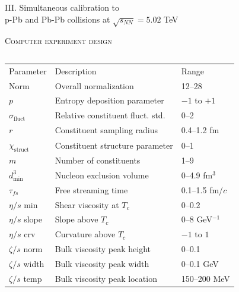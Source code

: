 \documentclass[aspectratio=169]{beamer}
\newcommand{\sqrts}{\sqrt{s_{NN}}}
\newcommand{\sigmaf}{\sigma_\text{fluct}}
\newcommand{\X}{\chi_\text{struct}}
\newcommand{\dmin}{d_\text{min}^3}
\newcommand{\paddedhline}{\noalign{\smallskip}\hline\noalign{\smallskip}}
\begin{document}
\begin{frame}
  \begin{center}
    \Large III. Simultaneous calibration to\\
    p-Pb and Pb-Pb collisions at $\sqrts=5.02$ TeV
  \end{center}
\end{frame}

\begin{frame}[t]{\scshape Computer experiment design}
  \bigskip
  \begin{columns}[T]
    \begin{column}{.6\textwidth}
      \scriptsize
      \begin{tabular}{lll}
        Parameter         & Description                        & Range           \\
        \paddedhline
        Norm              & Overall normalization              & 12--28          \\
        $p$               & Entropy deposition parameter       & $-1$ to $+1$    \\
        $\sigmaf$         & Relative constituent fluct. std.\  & 0--2            \\
        $r$               & Constituent sampling radius        & 0.4--1.2 fm     \\
        $\X$              & Constituent structure parameter    & 0--1            \\
        $m$               & Number of constituents             & 1--9            \\
        $\dmin$           & Nucleon exclusion volume           & 0--4.9 fm$^3$   \\
        $\tau_{fs}$       & Free streaming time                & 0.1--1.5 fm/$c$ \\
        $\eta/s$ min      & Shear viscosity at $T_c$           & 0--0.2          \\
        $\eta/s$ slope    & Slope above $T_c$                  & 0--8 GeV$^{-1}$ \\
        $\eta/s$ crv      & Curvature above $T_c$              & $-1$ to $1$     \\
        $\zeta/s$ norm    & Bulk viscosity peak height         & 0--0.1          \\
        $\zeta/s$ width   & Bulk viscosity peak width          & 0--0.1 GeV      \\
        $\zeta/s$ temp    & Bulk viscosity peak location       & 150--200 MeV    \\

\end{tabular}
\end{column}
\end{columns}
\end{frame}
\end{document}
